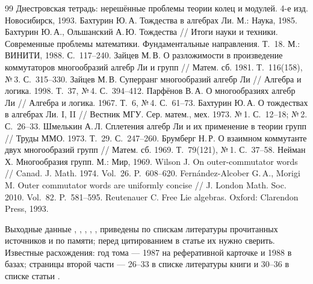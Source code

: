 \documentclass[11pt]{article}
\theoremstyle{plain}
\theoremstyle{definition}
\theoremstyle{remark}
\begin{document}
\begin{thebibliography}{99}
 Днестровская тетрадь: нерешённые проблемы теории колец и модулей. 4-е изд. Новосибирск, 1993.
 Бахтурин Ю.\,А. Тождества в алгебрах Ли. М.: Наука, 1985.
 Бахтурин Ю.\,А., Ольшанский А.\,Ю. Тождества // Итоги науки и техники. Современные проблемы математики. Фундаментальные направления. Т.~18. М.: ВИНИТИ, 1988. С.~117--240.
 Зайцев М.\,В. О разложимости в произведение коммутаторов многообразий алгебр Ли и групп // Матем. сб. 1981. Т.~116(158), №\,3. С.~315--330.
 Зайцев М.\,В. Суперранг многообразий алгебр Ли // Алгебра и логика. 1998. Т.~37, №\,4. С.~394--412.
 Парфёнов В.\,А. О многообразиях алгебр Ли // Алгебра и логика. 1967. Т.~6, №\,4. С.~61--73.
 Бахтурин Ю.\,А. О тождествах в алгебрах Ли. I, II // Вестник МГУ. Сер. матем., мех. 1973. №\,1. С.~12--18; №\,2. С.~26--33.
 Шмелькин А.\,Л. Сплетения алгебр Ли и их применение в теории групп // Труды ММО. 1973. Т.~29. С.~247--260.
 Брумберг Н.\,Р. О взаимном коммутанте двух многообразий групп // Матем. сб. 1969. Т.~79(121), №\,1. С.~37--58.
 Нейман Х. Многообразия групп. М.: Мир, 1969.
 Wilson J. On outer-commutator words // Canad. J. Math. 1974. Vol.~26. P.~608--620.
 Fern\'andez-Alcober G.\,A., Morigi M. Outer commutator words are uniformly concise // J. London Math. Soc. 2010. Vol.~82. P.~581--595.
 Reutenauer C. Free Lie algebras. Oxford: Clarendon Press, 1993.
\end{thebibliography}

\medskip
{\small Выходные данные \cite{BO}, \cite{Par}, \cite{Bah73}, \cite{Shm}, \cite{FAM}, \cite{Reu} приведены по спискам литературы прочитанных источников и по памяти; перед цитированием в статье их нужно сверить. Известные расхождения: год тома \cite{BO} --- 1987 на реферативной карточке и 1988 в базах; страницы второй части \cite{Bah73} --- 26--33 в списке литературы книги \cite{Bah} и 30--36 в списке статьи \cite{Z81}.}
\end{document}
